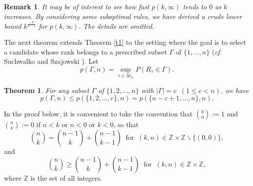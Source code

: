 \documentclass[12pt, A4paper, oneside]{article}
\theoremstyle{plain}
\newtheorem{thm}{Theorem}[section]
\newtheorem{rem}{Remark}[section]
\numberwithin{equation}{section}
\begin{document}
\begin{rem}
It may be of interest to see how fast $p(k,\infty)$ tends to $0$ as $k$ increases. By considering some suboptimal rules, we
have derived a crude lower bound $k^{\frac{-k}{k-1}}$ for $p(k,\infty)$. The details are omitted.
\end{rem}
The next theorem extends Theorem \ref{t1} to the setting where the goal is to select a candidate whose rank belongs to a prescribed subset
$\Gamma$ of $\{1,\dots,n\}$ ({\it cf.} Suchwalko and Szajowski \cite{ref25}). Let $$p(\Gamma,n)=\sup_{\tau \in \mathcal{M}_n} P(R_\tau \in \Gamma).$$

\begin{thm}\label{t2}
For any subset $\Gamma$ of $\{1,2,\dots,n\}$ with $|\Gamma|=c\;\;(1\le c <n)$, we have
$$
p(\Gamma,n)\le p(\{1,2,\dots,c\},n)=p(\{n-c+1,\dots,n\},n).
$$

\end{thm}

In the proof below, it is convenient to take the convention that ${0\choose 0}:=1$ and ${n\choose k}:=0$ if $n<k$ or $n<0$ or $k<0$, so that
\begin{equation}\label{e3}
{n\choose k}={n-1\choose k}+{n-1\choose k-1}\;\;\mbox{for}\;\;(k,n)\in\mathbb{Z}\times\mathbb{Z}\backslash\{(0,0)\},
\end{equation}
and
\begin{equation}\label{e4}
{n\choose k}\ge{n-1\choose k}+{n-1\choose k-1}\;\;\mbox{for}\;\;(k,n)\in\mathbb{Z}\times\mathbb{Z},
\end{equation}
where $\mathbb{Z}$ is the set of all integers.
\end{document}
